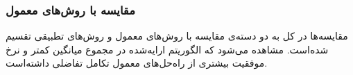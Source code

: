\documentclass[12pt,a4paper]{article}
\theoremstyle{definition}
\theoremstyle{theorem}
\theoremstyle{definition}
\begin{document}
\begin{figure}
\noindent{}
\end{figure}
\subsubsection{مقایسه‌ با روش‌های معمول}
مقایسه‌ها در کل به دو دسته‌ی مقایسه‌ با روش‌های معمول و روش‌های تطبیقی تقسیم شده‌است. مشاهده می‌شود که الگوریتم ارایه‌شده در مجموع میانگین کمتر و نرخ موفقیت بیشتری از راه‌حل‌های معمول تکامل تفاضلی داشته‌است.
\end{document}
